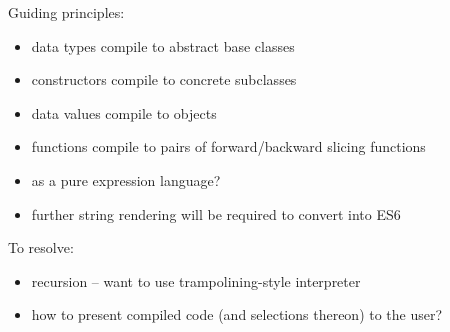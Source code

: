 
Guiding principles:
\begin{itemize}
   \item data types compile to abstract base classes
   \item constructors compile to concrete subclasses
   \item data values compile to objects
   \item functions compile to pairs of forward/backward slicing functions
   \item \JSCore as a pure expression language?
   \item further string rendering will be required to convert \JSCore into ES6
\end{itemize}

\noindent To resolve:
\begin{itemize}
   \item recursion -- want to use trampolining-style interpreter
   \item how to present compiled code (and selections thereon) to the user?
\end{itemize}




